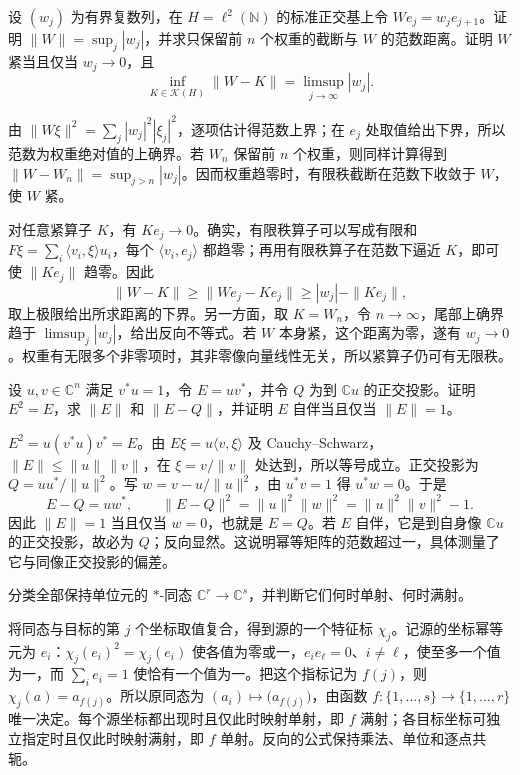 \begin{exercise}\label{b2:ex:D-diagonal-compact}
	设 \((w_j)\) 为有界复数列，在 \(H=\ell^2(\mathbb N)\) 的标准正交基上令 \(We_j=w_je_{j+1}\)。证明 \(\|W\|=\sup_j|w_j|\)，并求只保留前 \(n\) 个权重的截断与 \(W\) 的范数距离。证明 \(W\) 紧当且仅当 \(w_j\to0\)，且
	\[
		\inf_{K\in\mathcal K(H)}\|W-K\|=\limsup_{j\to\infty}|w_j|.
	\]
\end{exercise}
\begin{solution}
	由 \(\|W\xi\|^2=\sum_j|w_j|^2|\xi_j|^2\)，逐项估计得范数上界；在 \(e_j\) 处取值给出下界，所以范数为权重绝对值的上确界。若 \(W_n\) 保留前 \(n\) 个权重，则同样计算得到 \(\|W-W_n\|=\sup_{j>n}|w_j|\)。因而权重趋零时，有限秩截断在范数下收敛于 \(W\)，使 \(W\) 紧。

	对任意紧算子 \(K\)，有 \(Ke_j\to0\)。确实，有限秩算子可以写成有限和 \(F\xi=\sum_i\langle v_i,\xi\rangle u_i\)，每个 \(\langle v_i,e_j\rangle\) 都趋零；再用有限秩算子在范数下逼近 \(K\)，即可使 \(\|Ke_j\|\) 趋零。因此
	\[
		\|W-K\|\ge\|We_j-Ke_j\|\ge|w_j|-\|Ke_j\|,
	\]
	取上极限给出所求距离的下界。另一方面，取 \(K=W_n\)，令 \(n\to\infty\)，尾部上确界趋于 \(\limsup_j|w_j|\)，给出反向不等式。若 \(W\) 本身紧，这个距离为零，遂有 \(w_j\to0\)。权重有无限多个非零项时，其非零像向量线性无关，所以紧算子仍可有无限秩。
\end{solution}

\begin{exercise}\label{b2:ex:D-projection-versus-idempotent}
	设 \(u,v\in\mathbb C^n\) 满足 \(v^*u=1\)，令 \(E=uv^*\)，并令 \(Q\) 为到 \(\mathbb Cu\) 的正交投影。证明 \(E^2=E\)，求 \(\|E\|\) 和 \(\|E-Q\|\)，并证明 \(E\) 自伴当且仅当 \(\|E\|=1\)。
\end{exercise}
\begin{solution}
	\(E^2=u(v^*u)v^*=E\)。由 \(E\xi=u\langle v,\xi\rangle\) 及 Cauchy--Schwarz，\(\|E\|\le\|u\|\,\|v\|\)，在 \(\xi=v/\|v\|\) 处达到，所以等号成立。正交投影为 \(Q=uu^*/\|u\|^2\)。写 \(w=v-u/\|u\|^2\)，由 \(u^*v=1\) 得 \(u^*w=0\)。于是
	\[
		E-Q=uw^*,\qquad \|E-Q\|^2=\|u\|^2\|w\|^2=\|u\|^2\|v\|^2-1.
	\]
	因此 \(\|E\|=1\) 当且仅当 \(w=0\)，也就是 \(E=Q\)。若 \(E\) 自伴，它是到自身像 \(\mathbb Cu\) 的正交投影，故必为 \(Q\)；反向显然。这说明幂等矩阵的范数超过一，具体测量了它与同像正交投影的偏差。
\end{solution}

\begin{exercise}\label{b2:ex:D-finite-function-maps}
	分类全部保持单位元的 \(*\)-同态 \(\mathbb C^r\to\mathbb C^s\)，并判断它们何时单射、何时满射。
\end{exercise}
\begin{solution}
	将同态与目标的第 \(j\) 个坐标取值复合，得到源的一个特征标 \(\chi_j\)。记源的坐标幂等元为 \(e_i\)：\(\chi_j(e_i)^2=\chi_j(e_i)\) 使各值为零或一，\(e_ie_\ell=0\)、\(i\ne\ell\)，使至多一个值为一，而 \(\sum_i e_i=1\) 使恰有一个值为一。把这个指标记为 \(f(j)\)，则 \(\chi_j(a)=a_{f(j)}\)。所以原同态为 \((a_i)\mapsto\bigl(a_{f(j)}\bigr)\)，由函数 \(f:\{1,\ldots,s\}\to\{1,\ldots,r\}\) 唯一决定。每个源坐标都出现时且仅此时映射单射，即 \(f\) 满射；各目标坐标可独立指定时且仅此时映射满射，即 \(f\) 单射。反向的公式保持乘法、单位和逐点共轭。
\end{solution}

